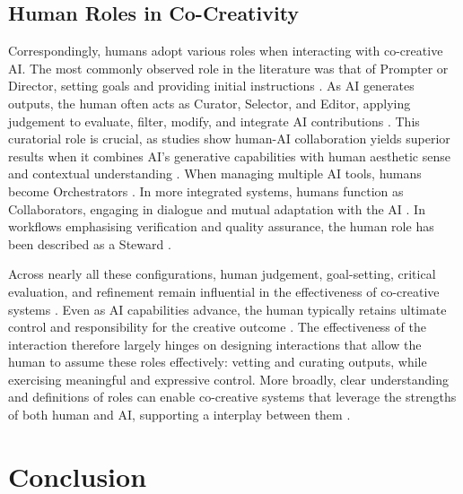 \subsection{Human Roles in Co-Creativity}
Correspondingly, humans adopt various roles when interacting with co-creative AI. The most commonly observed role in the literature was that of Prompter or Director, setting goals and providing initial instructions \citep{Oh2018-mu, Wan2023-he}. As AI generates outputs, the human often acts as Curator, Selector, and Editor, applying judgement to evaluate, filter, modify, and integrate AI contributions \citep{Hitsuwari2023-tw, Wu2025-or, Huang2020-fh}. This curatorial role is crucial, as studies show human-AI collaboration yields superior results when it combines AI's generative capabilities with human aesthetic sense and contextual understanding \citep{Hitsuwari2023-tw, Wu2025-or}. When managing multiple AI tools, humans become Orchestrators \citep{Palani2024-on}. In more integrated systems, humans function as Collaborators, engaging in dialogue and mutual adaptation with the AI \citep{Lawton2023-tb, Wan2023-he}. In workflows emphasising verification and quality assurance, the human role has been described as a Steward \citep{Lee2025-dw}.

Across nearly all these configurations, human judgement, goal-setting, critical evaluation, and refinement remain influential in the effectiveness of co-creative systems \citep{Li2024-yh, Hitsuwari2023-tw, Sarkar2023-ee}. Even as AI capabilities advance, the human typically retains ultimate control and responsibility for the creative outcome \citep{Shneiderman2020-ue, Li2024-yh}. The effectiveness of the interaction therefore largely hinges on designing interactions that allow the human to assume these roles effectively: vetting and curating outputs, while exercising meaningful and expressive control. More broadly, clear understanding and definitions of roles can enable co-creative systems that leverage the strengths of both human and AI, supporting a interplay between them \citep{Guzdial2019-cv, Moruzzi2024-cq, Weisz2024-io}.

\section{Conclusion}

